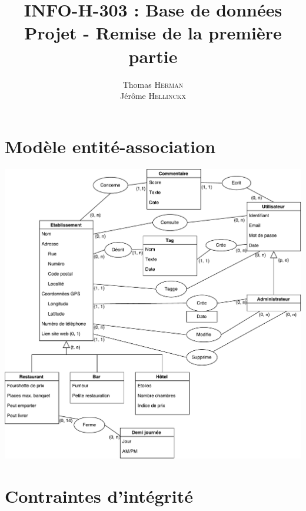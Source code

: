 \documentclass[a4paper, 11pt]{article}
\title{{INFO-H-303 : Base de données} \\ Projet - Remise de la première partie}
\author{Thomas \textsc{Herman} \\ Jérôme \textsc{Hellinckx}}
\begin{document}
\maketitle

\section{Modèle entité-association}
\begin{center}
	\includegraphics[scale=0.6]{horecaEA}
\end{center}

\section{Contraintes d'intégrité}
\end{document}
